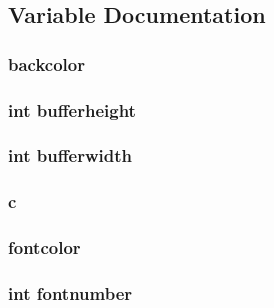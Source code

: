 \subsection{Variable Documentation}
\hypertarget{ID__VH_8C_ae05eaca54ea12a430673a8732425a748}{
\subsubsection[{backcolor}]{ {\bf backcolor}}}
\label{ID__VH_8C_ae05eaca54ea12a430673a8732425a748}
\hypertarget{ID__VH_8C_a03f2ca98b50de17e5b84834cdac38ff1}{
\subsubsection[{bufferheight}]{\setlength{\rightskip}{0pt plus 5cm}int {\bf bufferheight}}}
\label{ID__VH_8C_a03f2ca98b50de17e5b84834cdac38ff1}
\hypertarget{ID__VH_8C_ab8fea1ae304ccc29629c3c2d051364a4}{
\subsubsection[{bufferwidth}]{\setlength{\rightskip}{0pt plus 5cm}int {\bf bufferwidth}}}
\label{ID__VH_8C_ab8fea1ae304ccc29629c3c2d051364a4}
\hypertarget{ID__VH_8C_a6a23f31bb58d6a932349aa926c720e47}{
\subsubsection[{c}]{ {\bf c}}}
\label{ID__VH_8C_a6a23f31bb58d6a932349aa926c720e47}
\hypertarget{ID__VH_8C_a37dfad01117cac8636922fd4d030131b}{
\subsubsection[{fontcolor}]{ {\bf fontcolor}}}
\label{ID__VH_8C_a37dfad01117cac8636922fd4d030131b}
\hypertarget{ID__VH_8C_a4837949d7c7b2ed1e3f5874b69986fd8}{
\subsubsection[{fontnumber}]{\setlength{\rightskip}{0pt plus 5cm}int {\bf fontnumber}}}
